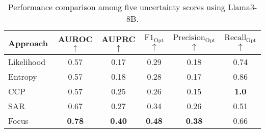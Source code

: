 \begin{table*}[t]
    \centering
    \small 
    \begin{tabular}{lccccc}
        \toprule
         Approach & AUROC $\uparrow$ & AUPRC $\uparrow$ & $\mathrm{F1}_\mathrm{Opt}$ $\uparrow$& $\mathrm{Precision}_\mathrm{Opt} $$\uparrow$ & $\mathrm{Recall}_\mathrm{Opt}$ $\uparrow$\\
        \midrule
        Likelihood~\citep{guerreiro-etal-2023-looking} & 0.57 & 0.17 & 0.29 & 0.18 & 0.74\\
        Entropy~\citep{malinin2021uncertainty} & 0.57 & 0.18 & 0.28 & 0.17 & 0.86\\
        CCP~\citep{fadeeva-etal-2024-fact} & 0.57 & 0.25 & 0.26 & 0.15 & \textbf{1.0}\\
        SAR~\cite{duan-etal-2024-shifting} & 0.67 & 0.27 & 0.34 & 0.26 & 0.51\\
        Focus~\citep{zhang-etal-2023-enhancing-uncertainty} & \textbf{0.78} & \textbf{0.40} & \textbf{0.48} & \textbf{0.38} & 0.66\\
        \bottomrule
    \end{tabular}
    \vspace{-0.5pc}
    \caption{
     Performance comparison among five uncertainty scores using Llama3-8B.
    }
    \vspace{-0.5pc}
    \label{tb:evaluation}
\end{table*}